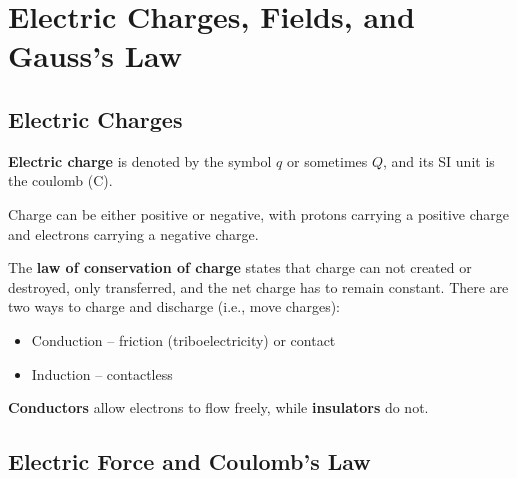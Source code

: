 \chapter{Electric Charges, Fields, and Gauss's Law}

\section{Electric Charges} \label{sec:electric-charges}

\textbf{Electric charge} is denoted by the symbol \(q\) or sometimes \(Q\),
and its SI unit is the coulomb (C).

Charge can be either positive or negative,
with protons carrying a positive charge and electrons carrying a
negative charge.

The \textbf{law of conservation of  charge} states that charge can
not created or destroyed,
only transferred,
and the net charge has to remain constant.
There are two ways to charge and discharge (i.e., move charges):
\begin{itemize}
    \item Conduction -- friction (triboelectricity) or contact
    \item Induction -- contactless
\end{itemize}

\textbf{Conductors} allow electrons to flow freely,
while \textbf{insulators} do not.
\vfil

\section{Electric Force and Coulomb's Law}

